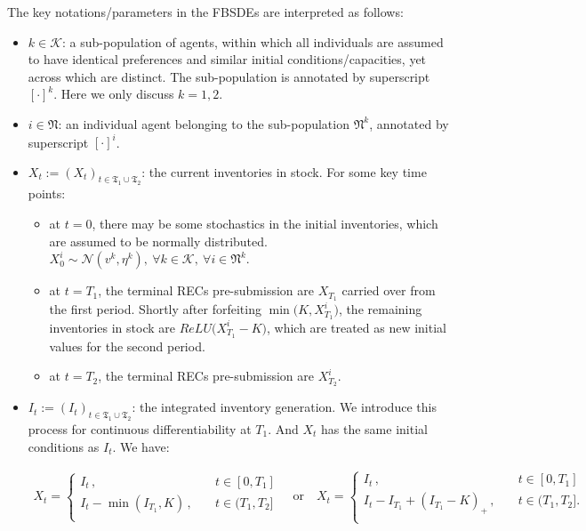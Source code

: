 \documentclass[a4paper,10pt]{article}
\newcommand{\1}{\mathbf{1}}
\begin{document}
The key notations/parameters in the FBSDEs are interpreted as follows:
\begin{itemize}
\item
  \(k \in \mathcal{K}\): a sub-population of agents, within which all
  individuals are assumed to have identical preferences and similar
  initial conditions/capacities, yet across which are distinct. The
  sub-population is annotated by superscript \([\cdot]^{k}\). Here we
  only discuss \(k=1,2\).
\item
  \(i \in \mathfrak{N}\): an individual agent belonging to the
  sub-population \(\mathfrak{N}^k\), annotated by superscript
  \([\cdot]^{i}\).
\item
  \(X_t := (X_t)_{t\in\mathfrak{T_1} \cup \mathfrak{T_2}}\): the current
  inventories in stock. For some key time points:

  \begin{itemize}
  \item
    at \(t=0\), there may be some stochastics in the initial
    inventories, which are assumed to be normally distributed.
    \(X_0^{i} \sim \mathcal{N}(v^k, \eta^k) ,~ \forall k \in \mathcal{K},~\forall i \in \mathfrak{N}^k\).
  \item
    at \(t=T_1\), the terminal RECs pre-submission are \(X_{T_1}\)
    carried over from the first period. Shortly after forfeiting
    \(\min\Big(K,X^i_{T_1}\Big)\), the remaining inventories in stock
    are \(ReLU\Big(X^i_{T_1}-K\Big)\), which are treated as new initial
    values for the second period.
  \item
    at \(t=T_2\), the terminal RECs pre-submission are \(X^i_{T_2}\).
  \end{itemize}
\item
  \(I_t := (I_t)_{t\in\mathfrak{T_1} \cup \mathfrak{T_2}}\): the
  integrated inventory generation. We introduce this process for
  continuous differentiability at \(T_1\). And \(X_t\) has the same
  initial conditions as \(I_t\). We have:

\begin{align}
    X_t=
    \begin{cases}
        I_t\, ,                  \quad& t \in [0,T_1]\\
        I_t- \min(I_{T_1},K)\, , \quad& t \in (T_1,T_2]\\
    \end{cases} 
    \quad\text{or}\quad
    X_t=
    \begin{cases}
        I_t\, ,                       \quad& t \in [0,T_1]\\
        I_t-I_{T_1}+(I_{T_1}-K)_+\, , \quad& t \in (T_1,T_2].\\
    \end{cases} 
\end{align}


\end{itemize}
\end{document}
